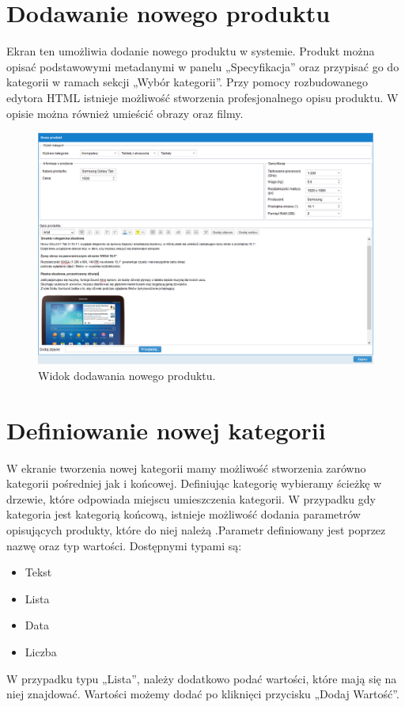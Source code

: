 \newpage
\section{Dodawanie nowego produktu}

Ekran ten umożliwia dodanie nowego produktu w systemie. Produkt można opisać podstawowymi metadanymi w panelu „Specyfikacja” oraz przypisać go do kategorii w ramach sekcji „Wybór kategorii”. Przy pomocy rozbudowanego edytora HTML istnieje możliwość stworzenia profesjonalnego opisu produktu. W opisie można również umieścić obrazy oraz filmy.

\begin{figure}[h]
	\centering
	\includegraphics[width=1.00\textwidth]{images/nowy_produkt.PNG}
	\caption{Widok dodawania nowego produktu.}
\end{figure}

\section{Definiowanie nowej kategorii}

W ekranie tworzenia nowej kategorii mamy możliwość stworzenia zarówno kategorii pośredniej jak i końcowej. Definiując kategorię wybieramy ścieżkę w drzewie, które odpowiada miejscu umieszczenia kategorii. W przypadku gdy kategoria jest kategorią końcową, istnieje możliwość dodania parametrów opisujących produkty, które do niej należą .Parametr definiowany jest poprzez nazwę oraz typ wartości. Dostępnymi typami są:
\begin{itemize}
\item Tekst
\item Lista
\item Data
\item Liczba
\end{itemize}
W przypadku typu „Lista”, należy dodatkowo podać wartości, które mają się na niej znajdować. Wartości  możemy dodać po kliknięci przycisku „Dodaj Wartość”.


